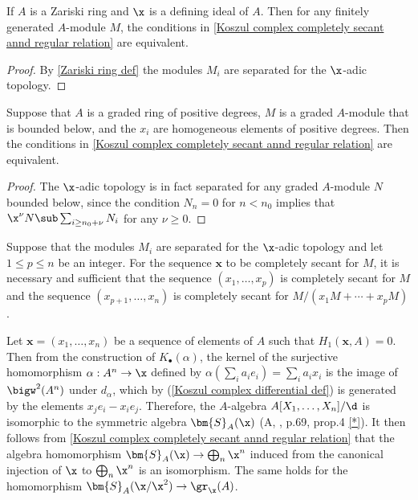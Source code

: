 \begin{corollary}\label{Koszul sequence Zariski ring complete secant is regular}
If $A$ is a Zariski ring and $\x$ is a defining ideal of $A$. Then for any finitely generated $A$-module $M$, the conditions in \cref{Koszul complex completely secant annd regular relation} are equivalent.
\end{corollary}
\begin{proof}
By \cref{Zariski ring def} the modules $M_i$ are separated for the $\x$-adic topology.
\end{proof}
\begin{corollary}\label{Koszul sequence graded ring complete secant is regular}
Suppose that $A$ is a graded ring of positive degrees, $M$ is a graded $A$-module that is bounded below, and the $x_i$ are homogeneous elements of positive degrees. Then the conditions in \cref{Koszul complex completely secant annd regular relation} are equivalent.
\end{corollary}
\begin{proof}
The $\x$-adic topology is in fact separated for any graded $A$-module $N$ bounded below, since the condition $N_n=0$ for $n<n_0$ implies that $\x^\nu N\sub\sum_{i\geq n_0+\nu}N_i$ for any $\nu\geq 0$.
\end{proof}
\begin{corollary}\label{Koszul sequence complete secant truncation}
Suppose that the modules $M_i$ are separated for the $\x$-adic topology and let $1\leq p\leq n$ be an integer. For the sequence $\bm{x}$ to be completely secant for $M$, it is necessary and sufficient that the sequence $(x_1,\dots,x_p)$ is completely secant for $M$ and the sequence $(x_{p+1},\dots,x_n)$ is completely secant for $M/(x_1M+\cdots+x_pM)$.
\end{corollary}
\begin{remark}
Let $\bm{x}=(x_1,\dots,x_n)$ be a sequence of elements of $A$ such that $H_1(\bm{x},A)=0$. Then from the construction of $K_\bullet(\alpha)$, the kernel of the surjective homomorphism $\alpha:A^n\to\x$ defined by $\alpha(\sum_ia_ie_i)=\sum_ia_ix_i$ is the image of $\bigw^2(A^n)$ under $d_\alpha$, which by (\ref{Koszul complex differential def}) is generated by the elements $x_je_i-x_ie_j$. Therefore, the $A$-algebra $A[X_1,\dots,X_n]/\d$ is isomorphic to the symmetric algebra $\bm{S}_A(\x)$ (A, , p.69, prop.4 \cref{*}). It then follows from \cref{Koszul complex completely secant annd regular relation} that the algebra homomorphism $\bm{S}_A(\x)\to\bigoplus_n\x^n$ induced from the canonical injection of $\x$ to $\bigoplus_n\x^n$ is an isomorphism. The same holds for the homomorphism $\bm{S}_A(\x/\x^2)\to\gr_\x(A)$. 
\end{remark}
